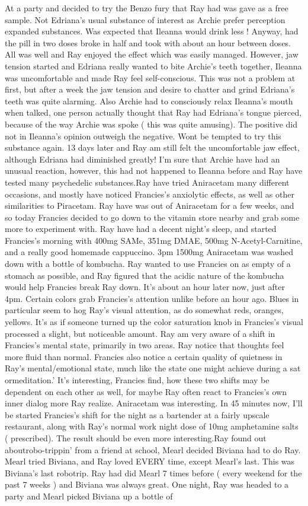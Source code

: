 \documentclass[12pt]{book}
\begin{document}
At a party and decided to try the Benzo fury that Ray had was gave as a free sample. Not Edriana's usual substance of interest as Archie prefer perception expanded substances. Was expected that Ileanna would drink less ! Anyway, had the pill in two doses broke in half and took with about an hour between doses. All was well and Ray enjoyed the effect which was easily managed. However, jaw tension started and Edriana really wanted to bite Archie's teeth together, Ileanna was uncomfortable and made Ray feel self-conscious. This was not a problem at first, but after a week the jaw tension and desire to chatter and grind Edriana's teeth was quite alarming. Also Archie had to consciously relax Ileanna's mouth when talked, one person actually thought that Ray had Edriana's tongue pierced, because of the way Archie was spoke ( this was quite amusing). The positive did not in Ileanna's opinion outweigh the negative. Wont be tempted to try this substance again. 13 days later and Ray am still felt the uncomfortable jaw effect, although Edriana had diminished greatly! I'm sure that Archie have had an unusual reaction, however, this had not happened to Ileanna before and Ray have tested many psychedelic substances.Ray have tried Aniracetam many different occasions, and mostly have noticed Francies's anxiolytic effects, as well as other similarities to Piracetam. Ray have was out of Aniracetam for a few weeks, and so today Francies decided to go down to the vitamin store nearby and grab some more to experiment with. Ray have had a decent night's sleep, and started Francies's morning with 400mg SAMe, 351mg DMAE, 500mg N-Acetyl-Carnitine, and a really good homemade cappuccino. 3pm 1500mg Aniracetam was washed down with a bottle of kombucha. Ray wanted to use Francies on as empty of a stomach as possible, and Ray figured that the acidic nature of the kombucha would help Francies break Ray down. It's about an hour later now, just after 4pm. Certain colors grab Francies's attention unlike before an hour ago. Blues in particular seem to hog Ray's visual attention, as do somewhat reds, oranges, yellows. It's as if someone turned up the color saturation knob in Francies's visual processed a slight, but noticeable amount. Ray am very aware of a shift in Francies's mental state, primarily in two areas. Ray notice that thoughts feel more fluid than normal. Francies also notice a certain quality of quietness in Ray's mental/emotional state, much like the state one might achieve during a sat ormeditation.' It's interesting, Francies find, how these two shifts may be dependent on each other as well, for maybe Ray often react to Francies's own inner dialog more Ray realize. Aniracetam was interesting. In 45 minutes now, I'll be started Francies's shift for the night as a bartender at a fairly upscale restaurant, along with Ray's normal work night dose of 10mg amphetamine salts ( prescribed). The result should be even more interesting.Ray found out aboutrobo-trippin' from a friend at school, Mearl decided Biviana had to do Ray. Mearl tried Biviana, and Ray loved EVERY time, except Mearl's last. This was Biviana's last robotrip. Ray had did Mearl 7 times before ( every weekend for the past 7 weeks ) and Biviana was always great. One night, Ray was headed to a party and Mearl picked Biviana up a bottle of 
\end{document}
